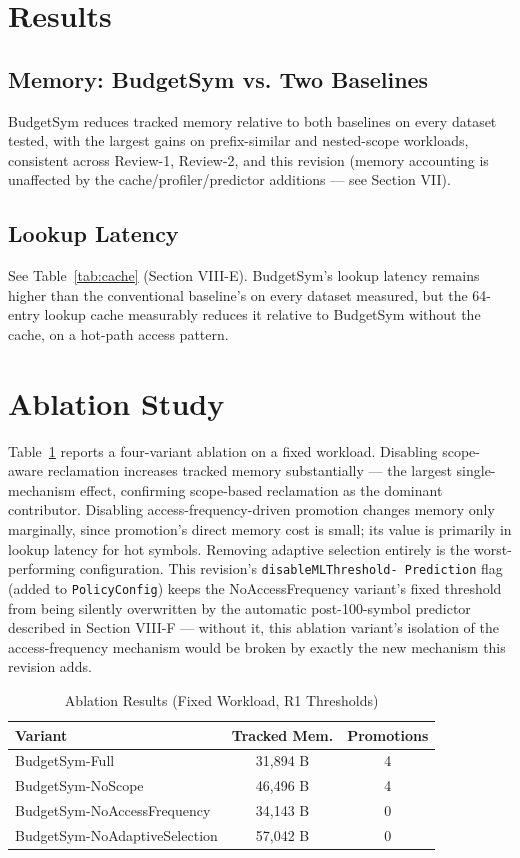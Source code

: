 \documentclass[conference]{IEEEtran}
\begin{document}
\section{Results}
\subsection{Memory: BudgetSym vs. Two Baselines}
BudgetSym reduces tracked memory relative to both baselines on every
dataset tested, with the largest gains on prefix-similar and nested-scope
workloads, consistent across Review-1, Review-2, and this revision (memory
accounting is unaffected by the cache/profiler/predictor additions --- see
Section VII).

\subsection{Lookup Latency}
See Table~\ref{tab:cache} (Section VIII-E). BudgetSym's lookup latency
remains higher than the conventional baseline's on every dataset measured,
but the 64-entry lookup cache measurably reduces it relative to BudgetSym
without the cache, on a hot-path access pattern.

\section{Ablation Study}
Table~\ref{tab:ablation} reports a four-variant ablation on a fixed
workload. Disabling scope-aware reclamation increases tracked memory
substantially --- the largest single-mechanism effect, confirming
scope-based reclamation as the dominant contributor. Disabling
access-frequency-driven promotion changes memory only marginally, since
promotion's direct memory cost is small; its value is primarily in lookup
latency for hot symbols. Removing adaptive selection entirely is the
worst-performing configuration. This revision's \texttt{disableMLThreshold-
Prediction} flag (added to \texttt{PolicyConfig}) keeps the
NoAccessFrequency variant's fixed threshold from being silently overwritten
by the automatic post-100-symbol predictor described in Section VIII-F ---
without it, this ablation variant's isolation of the access-frequency
mechanism would be broken by exactly the new mechanism this revision adds.

\begin{table}[htbp]
\caption{Ablation Results (Fixed Workload, R1 Thresholds)}
\label{tab:ablation}
\centering
\begin{tabular}{lcc}
\toprule
Variant & Tracked Mem. & Promotions \\
\midrule
BudgetSym-Full & 31{,}894 B & 4 \\
BudgetSym-NoScope & 46{,}496 B & 4 \\
BudgetSym-NoAccessFrequency & 34{,}143 B & 0 \\
BudgetSym-NoAdaptiveSelection & 57{,}042 B & 0 \\
\bottomrule
\end{tabular}
\end{table}
\end{document}
